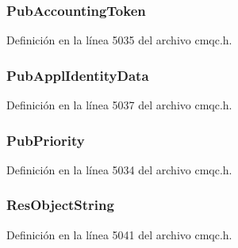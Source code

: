 \subsubsection[{Pub\+Accounting\+Token}]{ Pub\+Accounting\+Token}\label{structtag_m_q_s_d_af93c638cce691abfce1562bb498b1c38}


Definición en la línea 5035 del archivo cmqc.\+h.

\hypertarget{structtag_m_q_s_d_aeae4d639ab8ac667cc227e3c6463cc74}{}
\subsubsection[{Pub\+Appl\+Identity\+Data}]{ Pub\+Appl\+Identity\+Data}\label{structtag_m_q_s_d_aeae4d639ab8ac667cc227e3c6463cc74}


Definición en la línea 5037 del archivo cmqc.\+h.

\hypertarget{structtag_m_q_s_d_a328df5a5108eba2a9bef42f51adb9a7c}{}
\subsubsection[{Pub\+Priority}]{ Pub\+Priority}\label{structtag_m_q_s_d_a328df5a5108eba2a9bef42f51adb9a7c}


Definición en la línea 5034 del archivo cmqc.\+h.

\hypertarget{structtag_m_q_s_d_a8f35fe6f52369753de1259a9468437eb}{}
\subsubsection[{Res\+Object\+String}]{ Res\+Object\+String}\label{structtag_m_q_s_d_a8f35fe6f52369753de1259a9468437eb}


Definición en la línea 5041 del archivo cmqc.\+h.

\hypertarget{structtag_m_q_s_d_ab3a91014a229bd897c17cbd04563bca2}{}
